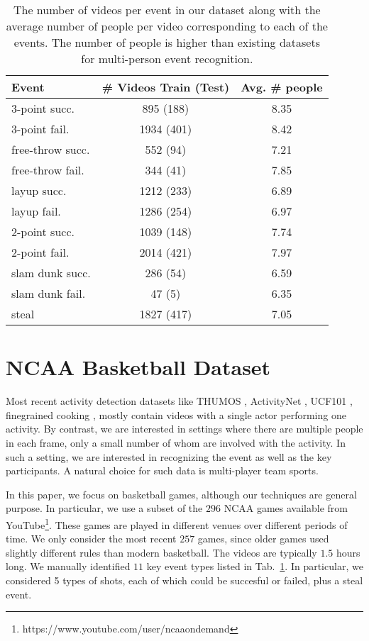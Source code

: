 \begin{table}[ht!]
\begin{center}
\small
 \begin{tabular}{|l|c|c|}
  \hline
  Event          & \# Videos Train (Test) & Avg. \# people \\ \hline \hline
  3-point succ.    & 895 (188) &  8.35 \\ 
  3-point fail.    & 1934 (401) &  8.42 \\ 
  free-throw succ. & 552 (94) &  7.21\\ 
  free-throw fail. & 344 (41) &  7.85\\  
  layup succ.      & 1212 (233) &  6.89\\ 
  layup fail.      & 1286 (254) &  6.97 \\ 
  2-point succ.    & 1039 (148) &  7.74 \\ 
  2-point fail.    & 2014 (421) &  7.97\\ 
  slam dunk succ.  & 286 (54) &  6.59 \\ 
  slam dunk fail.  & 47 (5) &  6.35\\ 
  steal & 1827 (417) & 7.05\\ \hline  
  \end{tabular}
\end{center}
  \caption{The number of videos per event in our dataset along with
  the average number of people per video corresponding to each of the
events. The number of people is higher than existing datasets for
multi-person event recognition.}
  \label{tab:data_dist}
\end{table}



\section{NCAA Basketball Dataset}
\label{sec:data}

Most recent activity detection datasets like THUMOS \cite{THUMOS},
ActivityNet \cite{ActivityNet}, UCF101 
\cite{UCF101}, finegrained cooking \cite{Finegrained_cooking},
mostly contain videos with a single actor performing one activity.
By contrast, we are interested in settings where there are multiple
people in each frame, only a small number of whom are involved with
the  activity. In such a setting, we are interested in recognizing the event
as well as the key participants. A natural choice for such data is
multi-player team sports.

In this paper, we focus on basketball games, although our techniques
are general purpose.
In particular,  we use a subset of the $296$ NCAA games available from 
YouTube\footnote{https://www.youtube.com/user/ncaaondemand}.  These games are
played in different venues over different periods of time.
We only consider the most recent $257$ games, since older games used
slightly different rules than modern basketball.
The videos are typically $1.5$ hours long.
We manually identified $11$ key event types
listed in Tab.~\ref{tab:data_dist}.
In particular, we considered 
5 types of shots, each of which could be succesful or failed,
plus a steal event. 

